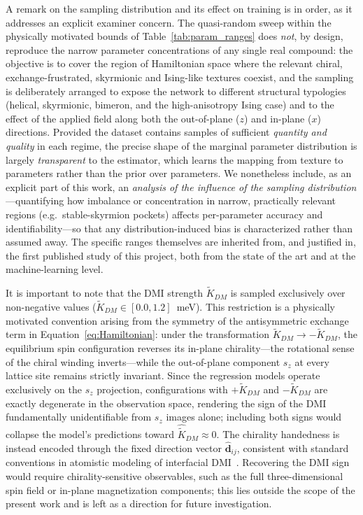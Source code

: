 \documentclass[letterpaper, 12, one column]{article}
\newcommand{\jc}[1]{\textcolor[rgb]{0.00,0.0,1.00}{#1}}
\begin{document}
\jc{A remark on the sampling distribution and its effect on training is in order, as it addresses an explicit examiner concern. The quasi-random sweep within the physically motivated bounds of Table~\ref{tab:param_ranges} does \emph{not}, by design, reproduce the narrow parameter concentrations of any single real compound: the objective is to cover the region of Hamiltonian space where the relevant chiral, exchange-frustrated, skyrmionic and Ising-like textures coexist, and the sampling is deliberately arranged to expose the network to different structural typologies (helical, skyrmionic, bimeron, and the high-anisotropy Ising case) and to the effect of the applied field along both the out-of-plane ($z$) and in-plane ($x$) directions. Provided the dataset contains samples of sufficient \emph{quantity and quality} in each regime, the precise shape of the marginal parameter distribution is largely \emph{transparent} to the estimator, which learns the mapping from texture to parameters rather than the prior over parameters. We nonetheless include, as an explicit part of this work, an \emph{analysis of the influence of the sampling distribution}---quantifying how imbalance or concentration in narrow, practically relevant regions (e.g.\ stable-skyrmion pockets) affects per-parameter accuracy and identifiability---so that any distribution-induced bias is characterized rather than assumed away. The specific ranges themselves are inherited from, and justified in, the first published study of this project, both from the state of the art and at the machine-learning level.}

It is important to note that the DMI strength $\tilde{K}_{DM}$ is sampled exclusively over non-negative values ($\tilde{K}_{DM} \in [0.0, 1.2]$~meV). This restriction is a physically motivated convention arising from the symmetry of the antisymmetric exchange term in Equation~\ref{eq:Hamiltonian}: under the transformation $\tilde{K}_{DM} \to -\tilde{K}_{DM}$, the equilibrium spin configuration reverses its in-plane chirality---the rotational sense of the chiral winding inverts---while the out-of-plane component $s_z$ at every lattice site remains strictly invariant. Since the regression models operate exclusively on the $s_z$ projection, configurations with $+\tilde{K}_{DM}$ and $-\tilde{K}_{DM}$ are exactly degenerate in the observation space, rendering the sign of the DMI fundamentally unidentifiable from $s_z$ images alone; including both signs would collapse the model's predictions toward $\hat{\tilde{K}}_{DM} \approx 0$. The chirality handedness is instead encoded through the fixed direction vector $\hat{\mathbf{d}}_{ij}$, consistent with standard conventions in atomistic modeling of interfacial DMI~\cite{fert2017magnetic, bogdanov1989thermodynamically, fillion2022gate}. Recovering the DMI sign would require chirality-sensitive observables, such as the full three-dimensional spin field or in-plane magnetization components; this lies outside the scope of the present work and is left as a direction for future investigation.
\end{document}
